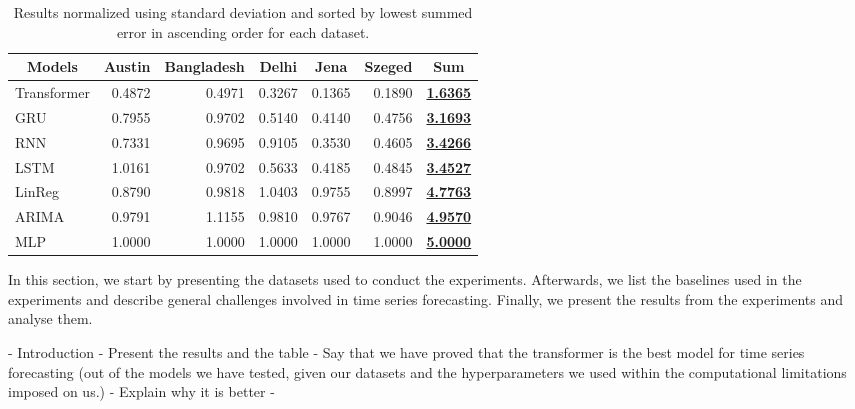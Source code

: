 \begin{table*}[t]
    \centering
    \caption {Results normalized using standard deviation and sorted by lowest summed error in ascending order for each dataset.} \label{tab:ResultsTableSummed} 
    \begin{tabular}{|l|r|r|r|r|r|r|}
    \hline
        \multicolumn{1}{|c|}{Models} & \multicolumn{1}{c|}{Austin} & \multicolumn{1}{c|}{Bangladesh} & \multicolumn{1}{c|}{Delhi} & \multicolumn{1}{c|}{Jena} & \multicolumn{1}{c|}{Szeged} & \multicolumn{1}{c|}{Sum} \\ \hline
        Transformer & 0.4872 & 0.4971 & 0.3267 & 0.1365 & 0.1890 & {\ul{\textbf{1.6365}}} \\ \hline
        GRU & 0.7955 & 0.9702 & 0.5140 & 0.4140 & 0.4756 & {\ul{\textbf{3.1693}}} \\ \hline
        RNN & 0.7331 & 0.9695 & 0.9105 & 0.3530 & 0.4605 & {\ul{\textbf{3.4266}}} \\ \hline
        LSTM & 1.0161 & 0.9702 & 0.5633 & 0.4185 & 0.4845 & {\ul{\textbf{3.4527}}} \\ \hline
        LinReg & 0.8790 & 0.9818 & 1.0403 & 0.9755 & 0.8997 & {\ul{\textbf{4.7763}}} \\ \hline
        ARIMA & 0.9791 & 1.1155 & 0.9810 & 0.9767 & 0.9046 & {\ul{\textbf{4.9570}}} \\ \hline
        MLP & 1.0000 & 1.0000 & 1.0000 & 1.0000 & 1.0000 & {\ul{\textbf{5.0000}}} \\ \hline
    \end{tabular}
\end{table*}

In this section, we start by presenting the datasets used to conduct the experiments.
Afterwards, we list the baselines used in the experiments and describe general challenges involved in time series forecasting.
Finally, we present the results from the experiments and analyse them.

- Introduction 
- Present the results and the table
- Say that we have proved that the transformer is the best model for time series forecasting (out of the models we have tested, given our datasets and the hyperparameters we used within the computational limitations imposed on us.)
    - Explain why it is better 
    - 

    
